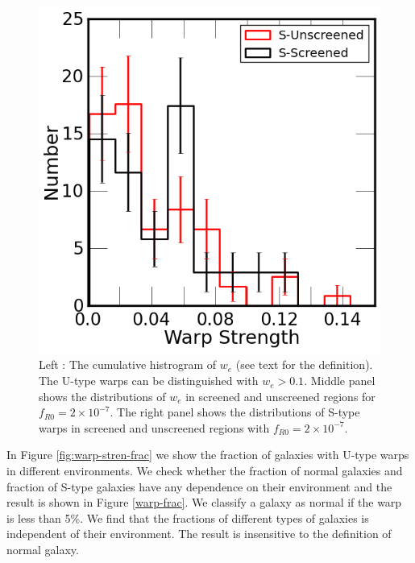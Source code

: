 \documentclass[useAMS,usenatbib,twocolumn]{mn2e}
\begin{document}
\begin{figure}
\begin{center}
\includegraphics[scale=0.35]{figures/warpness-S-distri.png}
\caption{Left : The cumulative histrogram of $w_e$ (see text for the
definition). The U-type warps can be distinguished  with $w_e > 0.1$. Middle
panel shows the distributions of $w_e$ in screened and unscreened regions for
$f_{R0}=2\times10^{-7}$. The right panel shows the distributions of S-type
warps in screened and unscreened regions with $f_{R0}=2\times10^{-7}$.}
\label{warp-cumu-1}
\end{center}
\end{figure}

In Figure \ref{fig:warp-stren-frac} we show the fraction of galaxies
with U-type warps in different environments. We check whether the fraction of
normal galaxies and fraction of S-type galaxies have any dependence on their
environment and the result is shown in Figure \ref{warp-frac}. We classify
a galaxy as normal if the warp is less than 5\%.  We find that the
fractions of different types of galaxies is independent of their
environment. The result is insensitive to
the definition of normal galaxy.
\end{document}
